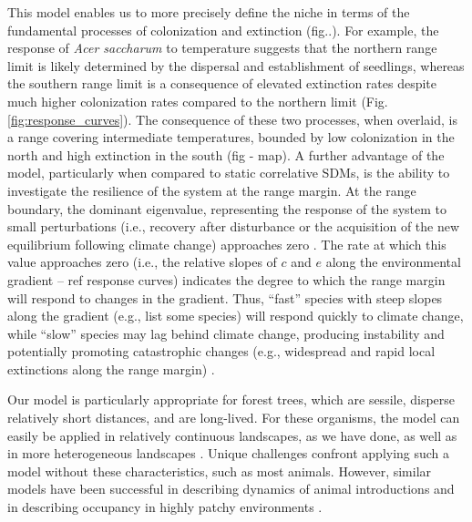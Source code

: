 \documentclass[11pt]{article}
\begin{document}
This model enables us to more precisely define the niche in terms of the fundamental processes of colonization and extinction (fig..). 
For example, the response of \emph{Acer saccharum} to temperature suggests that the northern range limit is likely determined by the dispersal and establishment of seedlings, whereas the southern range limit is a consequence of elevated extinction rates despite much higher colonization rates compared to the northern limit (Fig. \ref{fig:response_curves}).
The consequence of these two processes, when overlaid, is a range covering intermediate temperatures, bounded by low colonization in the north and high extinction in the south (fig - map).
A further advantage of the model, particularly when compared to static correlative SDMs, is the ability to investigate the resilience of the system at the range margin.
At the range boundary, the dominant eigenvalue, representing the response of the system to small perturbations (i.e., recovery after disturbance or the acquisition of the new equilibrium following climate change) approaches zero \cite{Scheffer2009}.
The rate at which this value approaches zero (i.e., the relative slopes of $c$ and $e$ along the environmental gradient -- ref response curves) indicates the degree to which the range margin will respond to changes in the gradient.
Thus, “fast” species with steep slopes along the gradient (e.g., list some species) will respond quickly to climate change, while “slow” species may lag behind climate change, producing instability and potentially promoting catastrophic changes (e.g., widespread and rapid local extinctions along the range margin) \cite{Scheffer2009, Scheffer2012}. %

Our model is particularly appropriate for forest trees, which are sessile, disperse relatively short distances, and are long-lived.
For these organisms, the model can easily be applied in relatively continuous landscapes, as we have done, as well as in more heterogeneous landscapes \cite{Garcia2013}.
Unique challenges confront applying such a model without these characteristics, such as most animals.
However, similar models have been successful in describing dynamics of animal introductions \cite{Yackulic2015} and in describing occupancy in highly patchy environments \cite{Ovaskainen2004, Harrison2011}.
\end{document}

